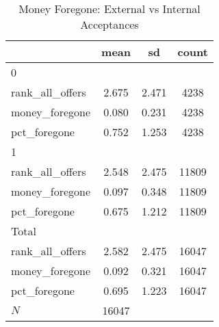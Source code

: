\begin{table}[htbp]\centering
\def\sym#1{\ifmmode^{#1}\else\(^{#1}\)\fi}
\caption{Money Foregone: External vs Internal Acceptances}
\begin{tabular}{l*{1}{ccc}}
\hline\hline
            &        mean&          sd&       count\\
\hline
0           &            &            &            \\
rank\_all\_offers&       2.675&       2.471&        4238\\
money\_foregone&       0.080&       0.231&        4238\\
pct\_foregone&       0.752&       1.253&        4238\\
\hline
1           &            &            &            \\
rank\_all\_offers&       2.548&       2.475&       11809\\
money\_foregone&       0.097&       0.348&       11809\\
pct\_foregone&       0.675&       1.212&       11809\\
\hline
Total       &            &            &            \\
rank\_all\_offers&       2.582&       2.475&       16047\\
money\_foregone&       0.092&       0.321&       16047\\
pct\_foregone&       0.695&       1.223&       16047\\
\hline
\(N\)       &       16047&            &            \\
\hline\hline
\end{tabular}
\end{table}
